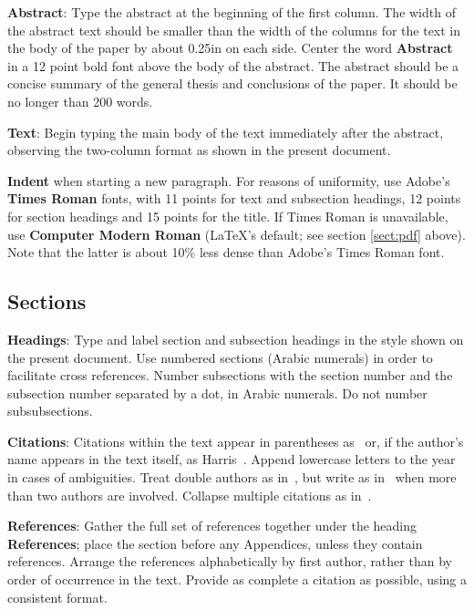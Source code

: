 \documentclass[11pt]{article}
\begin{document}
{\bf Abstract}: Type the abstract at the beginning of the first
column.  The width of the abstract text should be smaller than the
width of the columns for the text in the body of the paper by about
0.25in on each side.  Center the word {\bf Abstract} in a 12 point
bold font above the body of the abstract. The abstract should be a
concise summary of the general thesis and conclusions of the paper.
It should be no longer than 200 words.

{\bf Text}: Begin typing the main body of the text immediately after
the abstract, observing the two-column format as shown in 
the present document.

{\bf Indent} when starting a new paragraph. For reasons of uniformity,
use Adobe's {\bf Times Roman} fonts, with 11 points for text and 
subsection headings, 12 points for section headings and 15 points for
the title. If Times Roman is unavailable, use {\bf Computer Modern
  Roman} (\LaTeX{}'s default; see section \ref{sect:pdf} above).
Note that the latter is about 10\% less dense than Adobe's Times Roman
font.

\subsection{Sections}

{\bf Headings}: Type and label section and subsection headings in the
style shown on the present document.  Use numbered sections (Arabic
numerals) in order to facilitate cross references. Number subsections
with the section number and the subsection number separated by a dot,
in Arabic numerals. Do not number subsubsections.

{\bf Citations}: Citations within the text appear in parentheses
as~\cite{harris1955-phoneme} or, if the author's name appears in the
text itself, as Harris~.  Append
lowercase letters to the year in cases of ambiguities.  Treat double
authors as in~\cite{hafer1974-word}, but write as
in~\cite{hana2006-tagging} when more than two authors are involved.
Collapse multiple citations as
in~\cite{harris1967-morpheme,dejean1998-morphemes}.

\textbf{References}: Gather the full set of references together under
the heading {\bf References}; place the section before any Appendices,
unless they contain references. Arrange the references alphabetically
by first author, rather than by order of occurrence in the text.
Provide as complete a citation as possible, using a consistent format.
\end{document}
